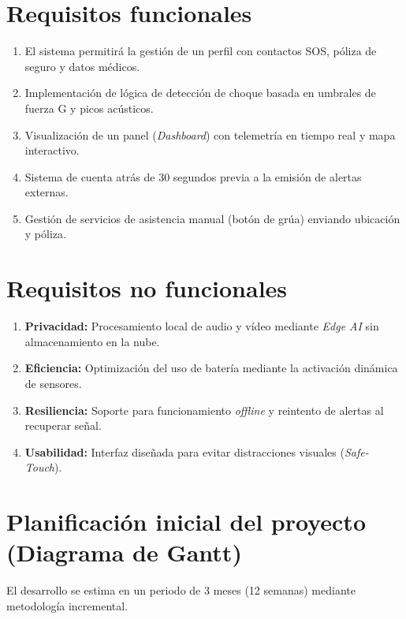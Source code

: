 \documentclass[11pt, a4paper]{article}
\begin{document}
    \section{Requisitos funcionales}
    \begin{enumerate}[label=\textbf{RF-\arabic*}]
    \item El sistema permitirá la gestión de un perfil con contactos SOS, póliza de seguro y datos médicos.
    \item Implementación de lógica de detección de choque basada en umbrales de fuerza G y picos acústicos.
    \item Visualización de un panel (\textit{Dashboard}) con telemetría en tiempo real y mapa interactivo.
    \item Sistema de cuenta atrás de 30 segundos previa a la emisión de alertas externas.
    \item Gestión de servicios de asistencia manual (botón de grúa) enviando ubicación y póliza.
    \end{enumerate}

    \section{Requisitos no funcionales}
    \begin{enumerate}[label=\textbf{RNF-\arabic*}]
    \item \textbf{Privacidad:} Procesamiento local de audio y vídeo mediante \textit{Edge AI} sin almacenamiento en la nube.
    \item \textbf{Eficiencia:} Optimización del uso de batería mediante la activación dinámica de sensores.
    \item \textbf{Resiliencia:} Soporte para funcionamiento \textit{offline} y reintento de alertas al recuperar señal.
    \item \textbf{Usabilidad:} Interfaz diseñada para evitar distracciones visuales (\textit{Safe-Touch}).
    \end{enumerate}

    \section{Planificación inicial del proyecto (Diagrama de Gantt)}
    El desarrollo se estima en un periodo de 3 meses (12 semanas) mediante metodología incremental.
\end{document}
